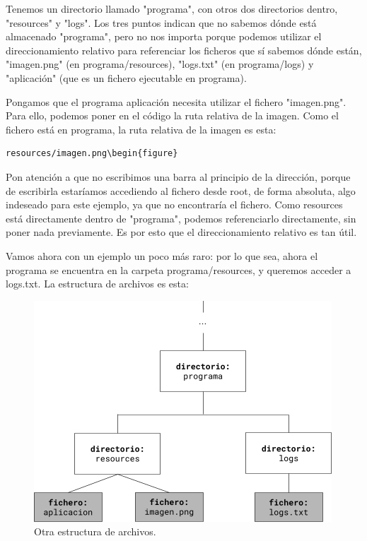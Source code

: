 Tenemos un directorio llamado "programa", con otros dos directorios dentro, "resources" y "logs". Los tres puntos indican que no sabemos dónde está almacenado "programa", pero no nos importa porque podemos utilizar el direccionamiento relativo para referenciar los ficheros que sí sabemos dónde están, "imagen.png" (en programa/resources), "logs.txt" (en programa/logs) y "aplicación" (que es un fichero ejecutable en programa).

Pongamos que el programa aplicación necesita utilizar el fichero "imagen.png". Para ello, podemos poner en el código la ruta relativa de la imagen. Como el fichero está en programa, la ruta relativa de la imagen es esta:

\begin{tcolorbox-code}
\begin{lstlisting}
resources/imagen.png\begin{figure}
\end{lstlisting}
\end{tcolorbox-code}

Pon atención a que no escribimos una barra al principio de la dirección, porque de escribirla estaríamos accediendo al fichero desde root, de forma absoluta, algo indeseado para este ejemplo, ya que no encontraría el fichero. Como resources está directamente dentro de "programa", podemos referenciarlo directamente, sin poner nada previamente. Es por esto que el direccionamiento relativo es tan útil.

Vamos ahora con un ejemplo un poco más raro: por lo que sea, ahora el programa se encuentra en la carpeta programa/resources, y queremos acceder a logs.txt. La estructura de archivos es esta:

\begin{figure}[H]
    \centering
    \includegraphics[width=0.80\linewidth]{resources/images/estructura_ficheros_2.png}
    \caption{Otra estructura de archivos.}
\end{figure}

